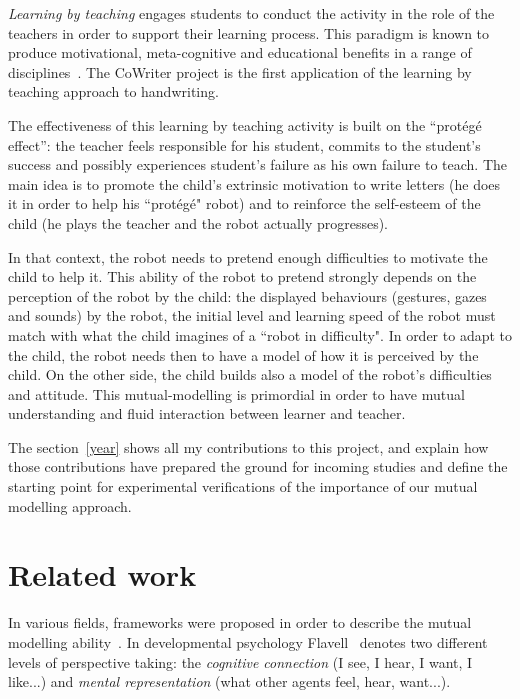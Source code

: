\documentclass[10pt,a4paper]{article}
\begin{document}
\emph{Learning by teaching} engages students to conduct the activity in the role of the teachers in order to support their learning process. 
This  paradigm is known to produce motivational, meta-cognitive and educational benefits in a range of disciplines~\cite{Rohrbeck2003}. 
The CoWriter project is the first application of the learning by teaching approach to handwriting.

The effectiveness of this learning by teaching activity is built on the ``prot\'eg\'e effect'': the teacher feels responsible for his student, commits to the student's success and possibly experiences student's failure as his own failure to teach. 
The main idea is to promote the child's extrinsic motivation to write letters (he does it in order to help his ``prot\'eg\'e" robot) and to reinforce the self-esteem of the child (he plays the teacher and the robot actually progresses).

In that context, the robot needs to pretend enough difficulties to motivate the child to help it. 
This ability of the robot to pretend strongly depends on the perception of the robot by the child: the displayed behaviours (gestures, gazes and sounds) by the robot, the initial level and learning speed of the robot must match with what the child imagines of a ``robot in difficulty".
In order to adapt to the child, the robot needs then to have a model of how it is perceived by the child. On the other side, the child builds also a model of the robot's difficulties and attitude. 
This mutual-modelling is primordial in order to have mutual understanding and fluid interaction between learner and teacher. 

The section~\ref{year} shows all my contributions to this project, and explain how those contributions have prepared the ground for incoming studies and define the starting point for experimental verifications of the importance of our mutual modelling approach.
\section{Related work}\label{rw}


In various fields, frameworks were proposed in order to describe the mutual modelling ability~\cite{lemaignan2015mutual}. 
In developmental psychology Flavell~\cite{flavell1990developmental} denotes two different levels of perspective taking: the \textit{cognitive connection} (I see, I hear, I want, I like...) and \textit{mental representation} (what other agents feel, hear, want...).
\end{document}
